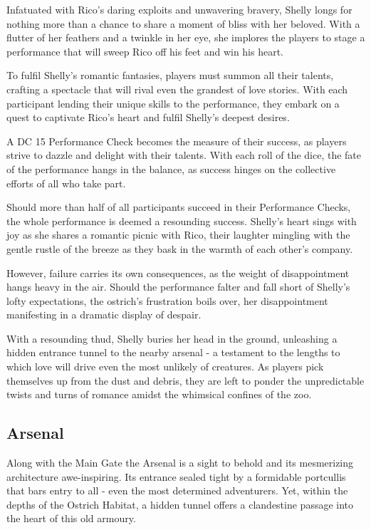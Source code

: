 Infatuated with Rico's daring exploits and unwavering bravery, Shelly longs for nothing more than a chance to share a moment of bliss with her beloved. With a flutter of her feathers and a twinkle in her eye, she implores the players to stage a performance that will sweep Rico off his feet and win his heart.

To fulfil Shelly's romantic fantasies, players must summon all their talents, crafting a spectacle that will rival even the grandest of love stories. With each participant lending their unique skills to the performance, they embark on a quest to captivate Rico's heart and fulfil Shelly's deepest desires.

A DC 15 Performance Check becomes the measure of their success, as players strive to dazzle and delight with their talents. With each roll of the dice, the fate of the performance hangs in the balance, as success hinges on the collective efforts of all who take part.

Should more than half of all participants succeed in their Performance Checks, the whole performance is deemed a resounding success. Shelly's heart sings with joy as she shares a romantic picnic with Rico, their laughter mingling with the gentle rustle of the breeze as they bask in the warmth of each other's company.

However, failure carries its own consequences, as the weight of disappointment hangs heavy in the air. Should the performance falter and fall short of Shelly's lofty expectations, the ostrich's frustration boils over, her disappointment manifesting in a dramatic display of despair.

With a resounding thud, Shelly buries her head in the ground, unleashing a hidden entrance tunnel to the nearby arsenal - a testament to the lengths to which love will drive even the most unlikely of creatures. As players pick themselves up from the dust and debris, they are left to ponder the unpredictable twists and turns of romance amidst the whimsical confines of the zoo.
\subsection*{ Arsenal}
Along with the Main Gate the Arsenal is a sight to behold and its mesmerizing architecture awe-inspiring.  Its entrance sealed tight by a formidable portcullis that bars entry to all - even the most determined adventurers. Yet, within the depths of the Ostrich Habitat, a hidden tunnel offers a clandestine passage into the heart of this old armoury.

